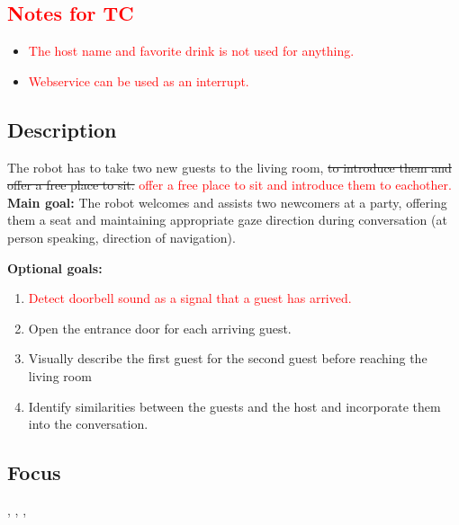 \subsection*{\textcolor{red}{Notes for TC}}
	\begin{itemize}
	\item \textcolor{red}{The host name and favorite drink is not used for anything.}
	\item \textcolor{red}{Webservice can be used as an interrupt.}
	\end{itemize}

\subsection*{Description}
The robot has to take two new guests to the living room, \sout{to introduce them and offer a free place to sit.} \textcolor{red}{offer a free place to sit and introduce them to eachother.}\\
    
\textbf{Main goal:}
    The robot welcomes and assists two newcomers at a party, offering them a seat and maintaining appropriate gaze direction during conversation (at person speaking, direction of navigation).

\textbf{Optional goals:}
\begin{enumerate}[nosep]
	\item \textcolor{red}{Detect doorbell sound as a signal that a guest has arrived.}
	\item Open the entrance door for each arriving guest.
	\item Visually describe the first guest for the second guest before reaching the living room
	\item Identify similarities between the guests and the host and incorporate them into the conversation.
\end{enumerate}

\subsection*{Focus}
\emph{\SysI{}}, \emph{\HRI{}}, \emph{\PerDet{}}, \emph{\PerRec{}}

